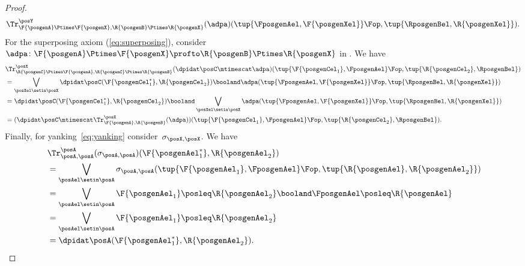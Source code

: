 {\begin{proof}
\begin{equation}
\begin{aligned}
{                    \Tr_{\F{\posgenA}\Ptimes \F{\posgenX},\R{\posgenB}\Ptimes \R{\posgenX}}^\posY(\adpa)(\tup{\FposgenAel,\F{\posgenXel}}\Fop,\tup{\RposgenBel,\R{\posgenXel}})}.
            \end{aligned}
        \end{equation}
        For the superposing axiom (\cref{eq:superposing}), consider~$\adpa\colon \F{\posgenA}\Ptimes \F{\posgenX}\profto \R{\posgenB}\Ptimes \R{\posgenX}$ in \DP.
        We have
        \begin{equation}
            \begin{aligned}
                {}
                 & \Tr_{\R{\posgenC}\Ptimes \F{\posgenA},\R{\posgenC}\Ptimes \R{\posgenB}}^{\posX}(\dpidat\posC\mtimescat \adpa)(\tup{\F{\posgenCel_1},\FposgenAel}\Fop,\tup{\R{\posgenCel_2},\RposgenBel}) \\
                 & = \bigvee_{\posXel \setin \posX} \dpidat\posC(\F{\posgenCel_1^*},\R{\posgenCel_2})\booland \adpa(\tup{\FposgenAel,\F{\posgenXel}}\Fop,\tup{\RposgenBel,\R{\posgenXel}}) \\
                 & =\dpidat\posC(\F{\posgenCel_1^*},\R{\posgenCel_2}) \booland \bigvee_{\posXel\setin \posX} \adpa(\tup{\FposgenAel,\F{\posgenXel}}\Fop,\tup{\RposgenBel,\R{\posgenXel}}) \\
                 & =(\dpidat\posC \mtimescat \Tr_{\F{\posgenA},\R{\posgenB}}^\posX(\adpa))(\tup{\F{\posgenCel_1},\FposgenAel}\Fop,\tup{\R{\posgenCel_2},\RposgenBel}).
            \end{aligned}
        \end{equation}
        Finally, for yanking~\cref{eq:yanking} consider~$\sigma_{\posX,\posX}$.
        We have
        \begin{equation}
            \begin{aligned}
                ~ & \Tr_{\posA,\posA}^{\posA}(\sigma_{\posA,\posA})(\F{\posgenAel_1^*},\R{\posgenAel_2}) \\
                  & = \bigvee_{\posAel\setin \posA} \sigma_{\posA,\posA}(\tup{\F{\posgenAel_1},\FposgenAel}\Fop,\tup{\R{\posgenAel},\R{\posgenAel_2}}) \\
                  & =\bigvee_{\posAel\setin \posA} \F{\posgenAel_1} \posleq \R{\posgenAel_2} \booland \FposgenAel\posleq \R{\posgenAel} \\
                  & =\bigvee_{\posAel\setin \posA} \F{\posgenAel_1} \posleq \R{\posgenAel_2} \\
                  & =\dpidat\posA(\F{\posgenAel_1^*},\R{\posgenAel_2}).
            \end{aligned}
        \end{equation}
    \end{proof}
}
